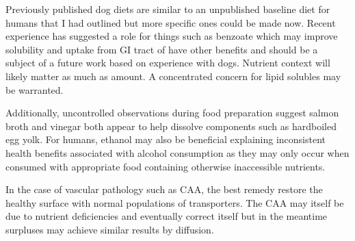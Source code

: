 \documentclass[aps,secnumarabic,balancelastpage,amsmath,amssymb,nofootinbib]{revtex4}
\newcommand{\mjmrefapp}[1]{Appendix   \ref{appendix:#1}}
\begin{document}
\begin{comment}
The other indicators
are not clean measurements  but do point to the
importance of tryptophan and tyrosine avialability
or metabolism. The ability to metabolize iron in the
diseased state is consistent with known vascular issues
and helps validate the results and reaffirm vascular
weakness and maybe a role for vitamin K and better
clotting. 
Prior work by other groups specialized towards
Alzheimer's has been published with encouraging
results although well controlled clinical trials
have not been performed to the best of my knowledge.



\end{comment}


Previously published dog diets 
\cite{marchywka-MJM-2022-013-0.10}
\cite{mmarchywka-MJM-2021-003-v0.50rg}
are similar to an unpublished  baseline diet for humans 
that I had outlined but more specific ones could be made now.
Recent experience has suggested a role for things such as
benzoate which may improve solubility and uptake
from GI tract of have other benefits\cite{marchywka-MJM-2022-013-0.10}
 and should be
a subject of a future work based on experience with dogs. Nutrient context
will likely matter as much as amount. A concentrated
concern for lipid solubles may be warranted. 

Additionally, uncontrolled observations during
food preparation suggest salmon broth and vinegar both appear
to help dissolve components such as hardboiled egg yolk.
For humans, ethanol may also be beneficial explaining
inconsistent health benefits associated with alcohol
consumption as they may only occur when consumed with
appropriate food containing otherwise inaccessible nutrients.


In the case of vascular pathology such as CAA, the best remedy 
restore the healthy surface with normal
populations of transporters. The CAA may itself be due to
nutrient deficiencies and eventually correct itself
but in the meantime surpluses may achieve similar
results by diffusion. 

\begin{comment}
Digestive impairments create on age related barrier to
nutrient usage.
Vascular issues present another barrier to nutrient exchange with
active organs especially the brain. A third barrier could
be overcome with substances excreted by microbes as
most of the nutrients considered are hydrophobic.  
\end{comment}
\end{document}
